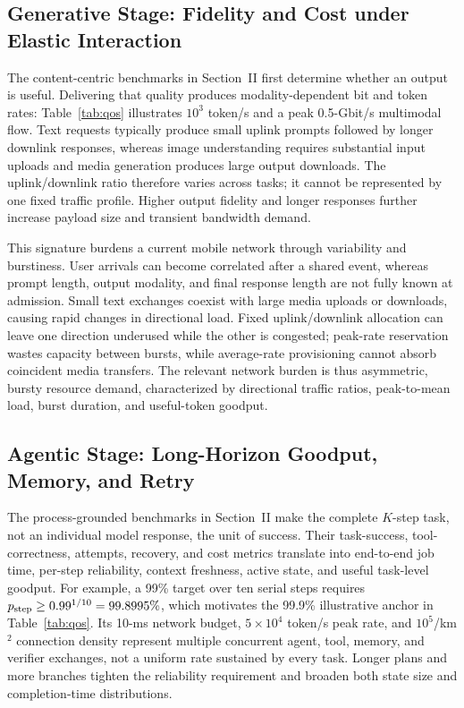 \documentclass[letterpaper,journal]{IEEEtran}
\begin{document}
\subsection{Generative Stage: Fidelity and Cost under Elastic Interaction}
The content-centric benchmarks in Section~II first determine whether an output
is useful. Delivering that quality produces modality-dependent bit and token
rates: Table~\ref{tab:qos} illustrates $10^3$ token/s and a peak 0.5-Gbit/s
multimodal flow. Text requests typically produce small uplink prompts followed
by longer downlink responses, whereas image understanding requires substantial
input uploads and media generation produces large output downloads. The
uplink/downlink ratio therefore varies across tasks; it cannot be represented
by one fixed traffic profile. Higher output fidelity and longer responses
further increase payload size and transient bandwidth demand.

This signature burdens a current mobile network through variability and
burstiness. User arrivals can become correlated after a shared event, whereas
prompt length, output modality, and final response length are not fully known
at admission. Small text exchanges coexist with large media uploads or
downloads, causing rapid changes in directional load. Fixed uplink/downlink
allocation can leave one direction underused while the other is congested;
peak-rate reservation wastes capacity between bursts, while average-rate
provisioning cannot absorb coincident media transfers. The relevant network
burden is thus asymmetric, bursty resource demand, characterized by directional
traffic ratios, peak-to-mean load, burst duration, and useful-token goodput.

\subsection{Agentic Stage: Long-Horizon Goodput, Memory, and Retry}
The process-grounded benchmarks in Section~II make the complete $K$-step task,
not an individual model response, the unit of success. Their task-success,
tool-correctness, attempts, recovery, and cost metrics translate into
end-to-end job time, per-step reliability, context freshness, active state,
and useful task-level goodput. For example, a 99\% target over ten serial steps
requires $p_{\rm step}\geq0.99^{1/10}=99.8995\%$, which motivates the 99.9\%
illustrative anchor in Table~\ref{tab:qos}. Its 10-ms network budget,
$5\!\times\!10^4$ token/s peak rate, and $10^5$/km$^2$ connection density
represent multiple concurrent agent, tool, memory, and verifier exchanges, not
a uniform rate sustained by every task. Longer plans and more branches tighten
the reliability requirement and broaden both state size and completion-time
distributions.
\end{document}
